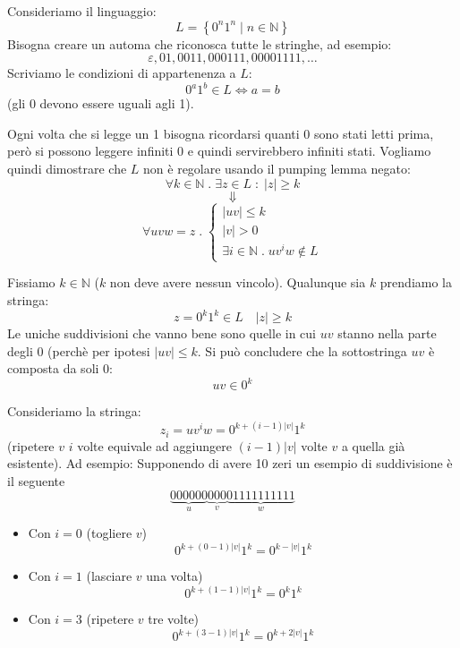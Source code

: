\documentclass[a4paper]{article}
\begin{document}
\begin{example}
  Consideriamo il linguaggio:
  \[
    L = \left\{ 0^n 1^n \;\left|\; n \in \mathbb{N} \right. \right\}
  \] 
  Bisogna creare un automa che riconosca tutte le stringhe, ad esempio:
  \[
    \varepsilon, 01, 0011, 000111, 00001111, \ldots
  \] 
  Scriviamo le condizioni di appartenenza a \( L \):
  \[
    0^a 1^b \in L \iff a = b
  \] 
  (gli 0 devono essere uguali agli 1).

  \noindent
  Ogni volta che si legge un 1 bisogna ricordarsi quanti 0 sono stati letti prima,
  però si possono leggere infiniti 0 e quindi servirebbero infiniti stati.
  Vogliamo quindi dimostrare che \( L \) non è regolare usando il pumping lemma negato:
  \[
    \forall k \in \mathbb{N} \;.\; \exists z \in L \;:\; |z| \ge k
  \] 
  \[
    \Downarrow
  \] 
  \[
    \forall  uvw = z \;.\; \begin{cases}
      |uv| \le k\\
      |v| > 0\\
      \exists i \in \mathbb{N} \;.\; uv^iw \notin L
    \end{cases}
  \] 

  \vspace{1em}
  \noindent
  Fissiamo \( k \in \mathbb{N} \) (\( k \) non deve avere nessun vincolo). Qualunque sia
  \( k \) prendiamo la stringa:
  \[
    z = 0^k 1^k \in L \quad |z| \ge k
  \] 
  Le uniche suddivisioni che vanno bene sono quelle in cui \( uv \) stanno nella
  parte degli 0 (perchè per ipotesi \( |uv| \le k \).
  Si può concludere che la sottostringa \( uv \) è composta da soli 0:
  \[
    uv \in 0^k
  \] 

  \vspace{1em}
  \noindent
  Consideriamo la stringa:
  \[
    z_i = uv^iw = 0^{k + (i-1)|v|} 1^k
  \] 
  (ripetere \( v \) \( i \) volte equivale ad aggiungere \( (i-1)|v| \) volte \( v \) a quella
  già esistente). Ad esempio:
  Supponendo di avere 10 zeri un esempio di suddivisione è il seguente
  \[
    \underbrace{000000}_{u}
    \underbrace{000}_{v}
    \underbrace{01111111111}_{w}
  \] 
  \begin{itemize}
    \item Con \( i = 0 \) (togliere \( v \))
      \[
        0^{k + (0-1)|v|} 1^k = 0^{k - |v|} 1^k
      \] 

    \item Con \( i = 1 \) (lasciare \( v \) una volta)
      \[
        0^{k + (1-1)|v|} 1^k = 0^{k} 1^k
      \] 

    \item Con \( i = 3 \) (ripetere \( v \) tre volte)
      \[
        0^{k + (3-1)|v|} 1^k = 0^{k + 2|v|} 1^k
      \]
  \end{itemize}


\end{example}
\end{document}
